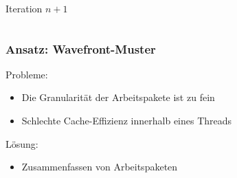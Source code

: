 \documentclass{beamer}
\begin{document}
\begin{frame}
\begin{columns}
\begin{column}{0.5\textwidth}
            \begin{center}
                Iteration $n+1$
            \end{center}
        \end{column}
    \end{columns}
\end{frame}

\begin{frame}
    \frametitle{Ansatz: Wavefront-Muster}
    Probleme:
    \begin{itemize}
        \item Die Granularität der Arbeitspakete ist zu fein
        \item Schlechte Cache-Effizienz innerhalb eines Threads
    \end{itemize}
    Lösung:
    \begin{itemize}
        \item Zusammenfassen von Arbeitspaketen
    \end{itemize}
\end{frame}
\end{document}
